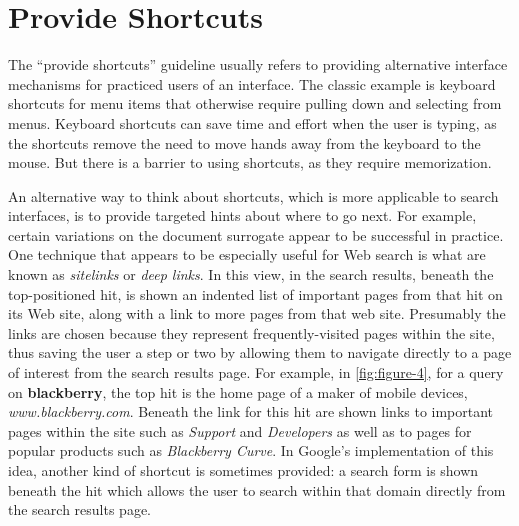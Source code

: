\documentclass[sigconf,nonacm,screen,pbalance]{acmart}
\begin{document}
\section{Provide Shortcuts}

The ``provide shortcuts'' guideline usually refers to providing alternative interface mechanisms for
practiced users of an interface. The classic example is keyboard shortcuts for menu items that otherwise
require pulling down and selecting from menus. Keyboard shortcuts can save time and effort when the user
is typing, as the shortcuts remove the need to move hands away from the keyboard to the mouse. But there
is a barrier to using shortcuts, as they require memorization.

An alternative way to think about shortcuts, which is more applicable to search interfaces, is to provide
targeted hints about where to go next. For example, certain variations on the document surrogate appear to
be successful in practice. One technique that appears to be especially useful for Web search is what are
known as {\em  sitelinks} or {\em  deep links}. In this view, in the search results, beneath the
top-positioned hit, is shown an indented list of important pages from that hit on its Web site, along with
a link to more pages from that web site. Presumably the links are chosen because they represent
frequently-visited pages within the site, thus saving the user a step or two by allowing them to navigate
directly to a page of interest from the search results page. For example, in \autoref{fig:figure-4}, for a query
on {\bf  blackberry}, the top hit is the home page of a maker of mobile devices, {\em 
www.blackberry.com}. Beneath the link for this hit are shown links to important pages within the site
such as {\em  Support} and {\em  Developers} as well as to pages for popular products such as {\em 
Blackberry Curve}. In Google's implementation of this idea, another kind of shortcut is sometimes
provided: a search form is shown beneath the hit which allows the user to search within that domain
directly from the search results page.
\end{document}
